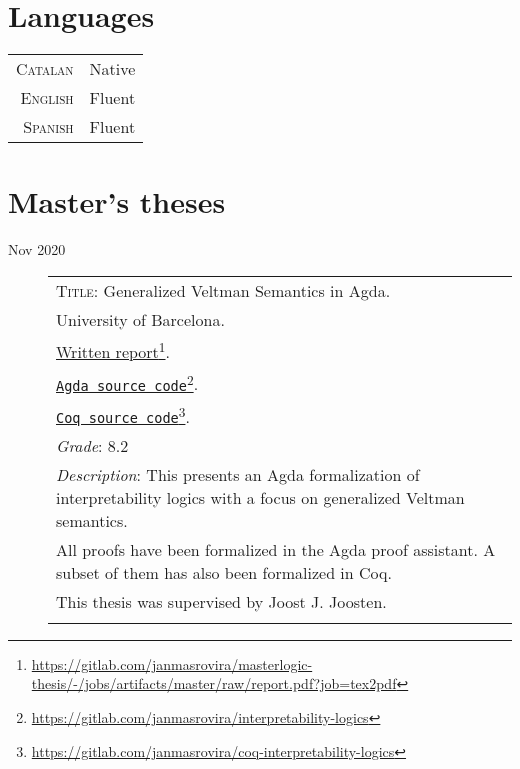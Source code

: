 \documentclass[11pt]{article}
\newcommand{\fnlink}[2]{\href{#1}{#2}\footnote{\url{#1}}}
\begin{document}
\section{Languages}

\begin{tabular}{rl}
  \textsc{Catalan} & Native \\
  \textsc{English} & Fluent \\
  \textsc{Spanish} & Fluent \\
\end{tabular}


\section{Master's theses}

\begin{description}
\item[Nov 2020]
\begin{minipage}{\textwidth}

  \begin{tabular}{|p{12cm}}

    \textsc{Title}: Generalized Veltman Semantics in Agda. \\
    University of Barcelona. \\
    \fnlink{https://gitlab.com/janmasrovira/masterlogic-thesis/-/jobs/artifacts/master/raw/report.pdf?job=tex2pdf}{Written report}. \\
    \fnlink{https://gitlab.com/janmasrovira/interpretability-logics}{\texttt{Agda source code}}. \\
    \fnlink{https://gitlab.com/janmasrovira/coq-interpretability-logics}{\texttt{Coq source code}}. \\
    \textit{Grade}: 8.2 \\
    \textit{Description}: This presents an Agda formalization of interpretability logics with a focus on generalized Veltman semantics.
    \\All proofs have been formalized in the Agda proof assistant. A subset of them has also been formalized in Coq.
    \\This thesis was supervised by Joost J. Joosten. \\
    \multicolumn{1}{c}{} \\

  \end{tabular}
\end{minipage}


\end{description}
\end{document}
